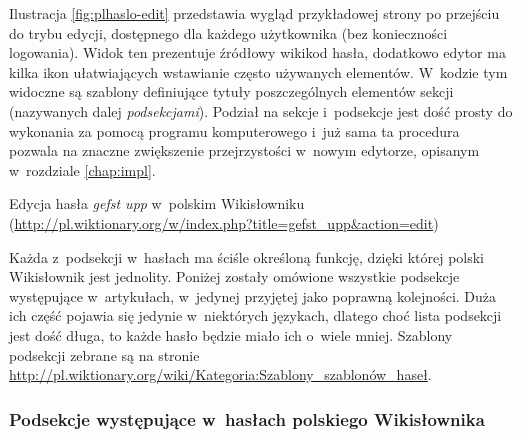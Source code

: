 \documentclass{pracamgr}
\begin{document}
Ilustracja \ref{fig:plhaslo-edit} przedstawia wygląd przykładowej strony po przejściu do trybu edycji, dostępnego dla każdego użytkownika (bez konieczności logowania). Widok ten prezentuje źródłowy wikikod hasła, dodatkowo edytor ma kilka ikon ułatwiających wstawianie często używanych elementów. W~kodzie tym widoczne są szablony definiujące tytuły poszczególnych elementów sekcji (nazywanych dalej \emph{podsekcjami}). Podział na sekcje i~podsekcje jest dość prosty do wykonania za pomocą programu komputerowego i~już sama ta procedura pozwala na znaczne zwiększenie przejrzystości w~nowym edytorze, opisanym w~rozdziale \ref{chap:impl}.

\begin{illustration}
	\caption{Edycja hasła \emph{gefst upp} w~polskim Wikisłowniku (\protect\url{http://pl.wiktionary.org/w/index.php?title=gefst_upp&action=edit})}
	\label{fig:plhaslo-edit}
\end{illustration}

Każda z~podsekcji w~hasłach ma ściśle określoną funkcję, dzięki której polski Wikisłownik jest jednolity. Poniżej zostały omówione wszystkie podsekcje występujące w~artykułach, w~jedynej przyjętej jako poprawną kolejności. Duża ich część pojawia się jedynie w~niektórych językach, dlatego choć lista podsekcji jest dość długa, to każde hasło będzie miało ich o~wiele mniej. Szablony podsekcji zebrane są na stronie \protect\url{http://pl.wiktionary.org/wiki/Kategoria:Szablony_szablonów_haseł}.
\subsubsection{Podsekcje występujące w~hasłach polskiego Wikisłownika}
\end{document}
